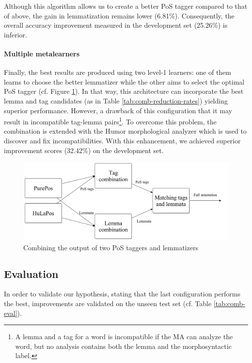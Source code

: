 Although this algorithm allows us to create a better PoS tagger compared to that of above, the gain in lemmatization remains lower (6.81\%).
Consequently, the overall accuracy improvement measured in the development set (25.26\%) is inferior.

\paragraph{Multiple metalearners}

Finally, the best results are produced using two level-1 learners: one of them learns to choose the better lemmatizer while the other aims to select the optimal PoS tagger (cf. Figure \ref{fig:comb3}).
In that  way, this architecture can incorporate the best lemma and tag candidates (as in Table \ref{tab:comb-reduction-rates}) yielding superior performance.
However, a drawback of this configuration that it may result in incompatible tag-lemma pairs\footnote{ A lemma and a tag for a word is incompatible if the MA can analyze the word, but no analysis contains both the lemma and the morphosyntactic label.}.
To overcome this problem, the combination is extended with the Humor morphological analyzer which is used to discover and fix incompatibilities.
With this enhancement, we achieved superior improvement scores (32.42\%) on the development set.

\begin{figure}[H]
  \centering
  \includegraphics[scale=0.2]{MorphTagging/comb3.png} 
  \caption{Combining the output of two PoS taggers and lemmatizers}
  \label{fig:comb3}
\end{figure}

\subsection{Evaluation}

In order to validate our hypothesis, stating that the last configuration performs the best, improvements are validated on the unseen test set (cf.
Table \ref{tab:comb-eval}).

